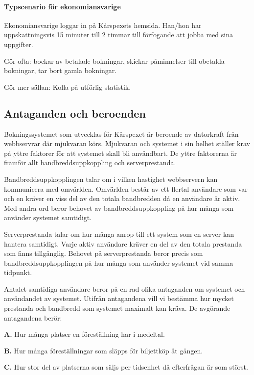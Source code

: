 \documentclass[a4paper, twoside, 11pt, titlepage]{article}
\begin{document}
			\paragraph{Typscenario för ekonomiansvarige}

			Ekonomiansvarige loggar in på Kårspexets hemsida. Han/hon har uppskattningsvis 15 minuter till 2 timmar till förfogande att jobba med sina uppgifter.

			Gör ofta: bockar av betalade bokningar, skickar påminnelser till obetalda bokningar, tar bort gamla bokningar.

			Gör mer sällan: Kolla på utförlig statistik.

	\subsection{Antaganden och beroenden}


	Bokningssystemet som utvecklas för Kårspexet är beroende av datorkraft från webbservrar där mjukvaran körs. Mjukvaran och systemet i sin helhet ställer krav på yttre faktorer för att systemet skall bli användbart. De yttre faktorerna är framför allt bandbreddsuppkoppling och serverprestanda.

	Bandbreddsuppkopplingen talar om i vilken hastighet webbservern kan kommunicera med omvärlden. Omvärlden består av ett flertal användare som var och en kräver en viss del av den totala bandbredden då en användare är aktiv. Med andra ord beror behovet av bandbreddsuppkoppling på hur många som använder systemet samtidigt.

	Serverprestanda talar om hur många anrop till ett system som en server kan hantera samtidigt. Varje aktiv användare kräver en del av den totala prestanda som finns tillgänglig. Behovet på serverprestanda beror precis som bandbreddsuppkopplingen på hur många som använder systemet vid samma tidpunkt.

	Antalet samtidiga användare beror på en rad olika antaganden om systemet och användandet av systemet. Utifrån antagandena vill vi bestämma hur mycket prestanda och bandbredd som systemet maximalt kan kräva. De avgörande antagandena berör:

	\textbf{A.} Hur många platser en föreställning har i medeltal.

	\textbf{B.} Hur många föreställningar som släpps för biljettköp åt gången.

	\textbf{C.} Hur stor del av platserna som säljs per tidsenhet då efterfrågan är som störst.
\end{document}
